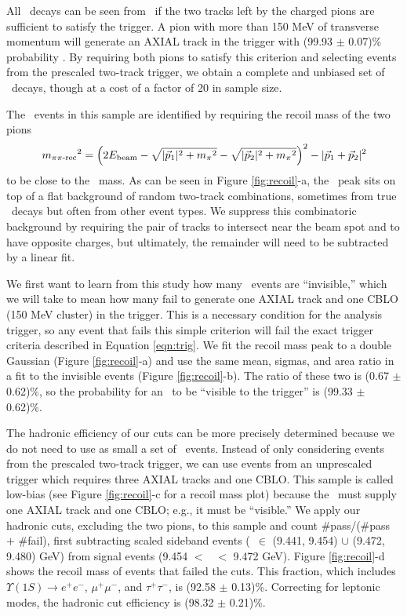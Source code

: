 \documentclass[aps,prd,preprint,superscriptaddress,tightenlines,nofootinbib,floatfix]{revtex4}
\begin{document}
All \uone\ decays can be seen from \twotoone\ if the two tracks left
by the charged pions are sufficient to satisfy the trigger.  A pion
with more than 150 MeV of transverse momentum will generate an AXIAL
track in the trigger with (99.93 $\pm$ 0.07)\% probability
\cite{inga}.  By requiring both pions to satisfy this criterion and
selecting events from the prescaled two-track trigger, we obtain a
complete and unbiased set of \uone\ decays, though at a cost of a
factor of 20 in sample size.

The \twotoone\ events in this sample are identified by requiring the
recoil mass of the two pions
\begin{equation}
  {m_{\mbox{\scriptsize $\pi\pi$-rec}}}^2 = \left(2 E_{\mbox{\scriptsize beam}} - \sqrt{|\vec{p}_1|^2 + {m_\pi}^2}
  - \sqrt{|\vec{p}_2|^2 + {m_\pi}^2}\right)^2 - |\vec{p}_1 + \vec{p}_2|^2
\end{equation}
to be close to the \uone\ mass.  As can be seen in Figure
\ref{fig:recoil}-a, the \uone\ peak sits on top of a flat background
of random two-track combinations, sometimes from true \twotoone\
decays but often from other event types.  We suppress this
combinatoric background by requiring the pair of tracks to intersect
near the beam spot and to have opposite charges, but ultimately, the
remainder will need to be subtracted by a linear fit.

We first want to learn from this study how many \uone\ events are
``invisible,'' which we will take to mean how many fail to generate
one AXIAL track and one CBLO (150 MeV cluster) in the trigger.  This
is a necessary condition for the analysis trigger, so any event that
fails this simple criterion will fail the exact trigger criteria
described in Equation \ref{eqn:trig}.  We fit the recoil mass peak to
a double Gaussian (Figure \ref{fig:recoil}-a) and use the same mean,
sigmas, and area ratio in a fit to the invisible events (Figure
\ref{fig:recoil}-b).  The ratio of these two is (0.67 $\pm$ 0.62)\%,
so the probability for an \uone\ to be ``visible to the trigger'' is
(99.33 $\pm$ 0.62)\%.

The hadronic efficiency of our cuts can be more precisely determined
because we do not need to use as small a set of \twotoone\ events.
Instead of only considering events from the prescaled two-track
trigger, we can use events from an unprescaled trigger which requires
three AXIAL tracks and one CBLO.  This sample is called low-bias (see
Figure \ref{fig:recoil}-c for a recoil mass plot) because the \uone\
must supply one AXIAL track and one CBLO; e.g., it must be
``visible.''  We apply our hadronic cuts, excluding the two pions, to
this sample and count \#pass/(\#pass $+$ \#fail), first subtracting
scaled sideband events (\mpprec\ $\in$ (9.441, 9.454) $\cup$ (9.472,
9.480) GeV) from signal events (9.454 $<$ \mpprec\ $<$ 9.472 GeV).
Figure \ref{fig:recoil}-d shows the recoil mass of events that failed
the cuts.  This fraction, which includes $\Upsilon(1S) \to e^+e^-$,
$\mu^+\mu^-$, and $\tau^+\tau^-$, is (92.58 $\pm$ 0.13)\%.  Correcting
for leptonic modes, the hadronic cut efficiency is (98.32 $\pm$
0.21)\%.
\end{document}
